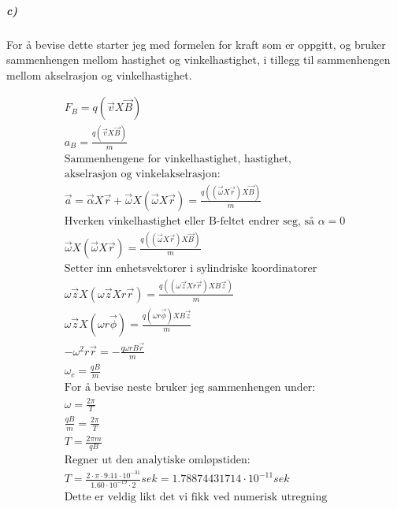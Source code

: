 \documentclass[11pt, A4paper,norsk]{article}
\begin{document}
	
	
	
	
	
	
	
	
			\subparagraph{c)}
				\begin{flushleft}
For å bevise dette starter jeg med formelen for kraft som er oppgitt, og bruker sammenhengen mellom hastighet og vinkelhastighet, i tillegg til sammenhengen mellom akselrasjon og vinkelhastighet.
				\end{flushleft}
				\begin{align}
F_B = q(\vec{v} X \vec{B}) \\
a_B = \frac{q(\vec{v} X \vec{B})}{m} \\
\text{Sammenhengene for vinkelhastighet, hastighet,} \nonumber \\
\text{akselrasjon og vinkelakselrasjon:} \nonumber \\
\vec{a} = \vec{\alpha} X \vec{r} + \vec{\omega} X (\vec{\omega} X \vec{r}) = \frac{q((\vec{\omega} X \vec{r}) X \vec{B})}{m} \\
\text{Hverken vinkelhastighet eller B-feltet endrer seg, så $\alpha = 0$} \nonumber \\
\vec{\omega} X (\vec{\omega} X \vec{r}) = \frac{q((\vec{\omega} X \vec{r}) X \vec{B})}{m} \\
\text{Setter inn enhetsvektorer i sylindriske koordinatorer} \nonumber \\
\omega \vec{z} X (\omega \vec{z} X r \vec{r}) = \frac{q((\omega \vec{z} X r \vec{r}) X B \vec{z})}{m} \\
\omega \vec{z} X (\omega r \vec{\phi}) = \frac{q(\omega r \vec{\phi}) X B \vec{z}}{m} \\
- \omega^2 r \vec{r} = - \frac{q \omega r B \vec{r}}{m} \\
\omega_c = \frac{qB}{m} \\
\text{For å bevise neste bruker jeg sammenhengen under:} \nonumber \\
\omega = \frac{2 \pi}{T} \\
\frac{qB}{m} = \frac{2 \pi}{T} \\
T = \frac{2 \pi m}{qB} \\
\text{Regner ut den analytiske omløpstiden:} \nonumber \\
T = \frac{2 \cdot \pi \cdot 9.11 \cdot 10^{-31}}{1.60 \cdot 10^{-19} \cdot 2} sek = 1.78874431714 \cdot 10^{-11} sek \\
\text{Dette er  veldig likt det vi fikk ved numerisk utregning} \nonumber
				\end{align}
\clearpage
	
\end{document}
